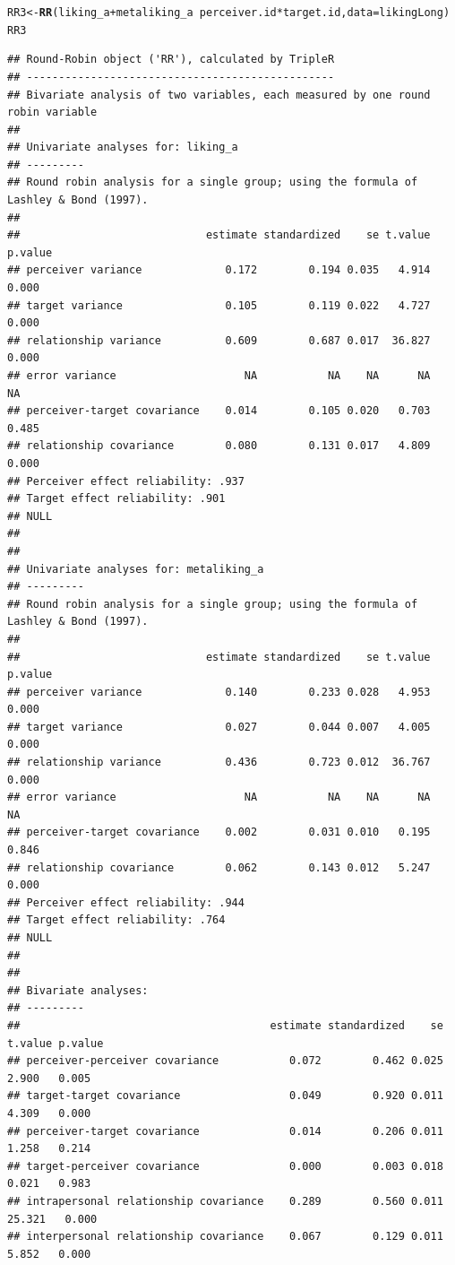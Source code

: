 \documentclass[a4paper]{article}\usepackage[]{graphicx}\usepackage[]{color}
\makeatletter
\newcommand{\hlopt}[1]{\textcolor[rgb]{0,0,0}{#1}}%
\newcommand{\hlstd}[1]{\textcolor[rgb]{0.345,0.345,0.345}{#1}}%
\newcommand{\hlkwb}[1]{\textcolor[rgb]{0.69,0.353,0.396}{#1}}%
\newcommand{\hlkwc}[1]{\textcolor[rgb]{0.333,0.667,0.333}{#1}}%
\newcommand{\hlkwd}[1]{\textcolor[rgb]{0.737,0.353,0.396}{\textbf{#1}}}%
\newenvironment{kframe}{%
 \def\at@end@of@kframe{}%
 \ifinner\ifhmode%
  \def\at@end@of@kframe{\end{minipage}}%
  \begin{minipage}{\columnwidth}%
 \fi\fi%
 \def\FrameCommand##1{\hskip\@totalleftmargin \hskip-\fboxsep
 \colorbox{shadecolor}{##1}\hskip-\fboxsep
     \hskip-\linewidth \hskip-\@totalleftmargin \hskip\columnwidth}%
 \MakeFramed {\advance\hsize-\width
   \@totalleftmargin\z@ \linewidth\hsize
   \@setminipage}}%
 {\par\unskip\endMakeFramed%
 \at@end@of@kframe}
\newenvironment{knitrout}{}{} %
\makeatother
\begin{document}
\begin{knitrout}\small
{}\color{fgcolor}\begin{kframe}
\begin{alltt}
\hlstd{RR3} \hlkwb{<-} \hlkwd{RR}\hlstd{(liking_a} \hlopt{+} \hlstd{metaliking_a} \hlopt{~} \hlstd{perceiver.id} \hlopt{*} \hlstd{target.id,} \hlkwc{data} \hlstd{= likingLong)}
\hlstd{RR3}
\end{alltt}
\begin{verbatim}
## Round-Robin object ('RR'), calculated by TripleR
## ------------------------------------------------
## Bivariate analysis of two variables, each measured by one round robin variable
## 
## Univariate analyses for: liking_a 
## ---------
## Round robin analysis for a single group; using the formula of Lashley & Bond (1997).
## 
##                             estimate standardized    se t.value p.value
## perceiver variance             0.172        0.194 0.035   4.914   0.000
## target variance                0.105        0.119 0.022   4.727   0.000
## relationship variance          0.609        0.687 0.017  36.827   0.000
## error variance                    NA           NA    NA      NA      NA
## perceiver-target covariance    0.014        0.105 0.020   0.703   0.485
## relationship covariance        0.080        0.131 0.017   4.809   0.000
## Perceiver effect reliability: .937 
## Target effect reliability: .901 
## NULL
## 
## 
## Univariate analyses for: metaliking_a 
## ---------
## Round robin analysis for a single group; using the formula of Lashley & Bond (1997).
## 
##                             estimate standardized    se t.value p.value
## perceiver variance             0.140        0.233 0.028   4.953   0.000
## target variance                0.027        0.044 0.007   4.005   0.000
## relationship variance          0.436        0.723 0.012  36.767   0.000
## error variance                    NA           NA    NA      NA      NA
## perceiver-target covariance    0.002        0.031 0.010   0.195   0.846
## relationship covariance        0.062        0.143 0.012   5.247   0.000
## Perceiver effect reliability: .944 
## Target effect reliability: .764 
## NULL
## 
## 
## Bivariate analyses:
## ---------
##                                       estimate standardized    se t.value p.value
## perceiver-perceiver covariance           0.072        0.462 0.025   2.900   0.005
## target-target covariance                 0.049        0.920 0.011   4.309   0.000
## perceiver-target covariance              0.014        0.206 0.011   1.258   0.214
## target-perceiver covariance              0.000        0.003 0.018   0.021   0.983
## intrapersonal relationship covariance    0.289        0.560 0.011  25.321   0.000
## interpersonal relationship covariance    0.067        0.129 0.011   5.852   0.000
\end{verbatim}
\end{kframe}
\end{knitrout}
\end{document}
